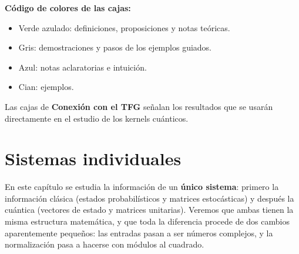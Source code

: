 \documentclass[11pt, a4paper, twoside, openright]{report}
\begin{document}
\noindent \textbf{Código de colores de las cajas:}
\begin{itemize}
    \item \colorbox{teal!10}{Verde azulado}: definiciones, proposiciones y notas teóricas.
    \item \colorbox{gray!10}{Gris}: demostraciones y pasos de los ejemplos guiados.
    \item \colorbox{blue!8}{Azul}: notas aclaratorias e intuición.
    \item \colorbox{cyan!10}{Cian}: ejemplos.
\end{itemize}

\noindent Las cajas de \textbf{Conexión con el TFG} señalan los resultados que se usarán directamente en el estudio de los kernels cuánticos.

\cleardoublepage
\tableofcontents


\chapter{Sistemas individuales}

\noindent En este capítulo se estudia la información de un \textbf{único sistema}: primero la información clásica (estados probabilísticos y matrices estocásticas) y después la cuántica (vectores de estado y matrices unitarias). Veremos que ambas tienen la misma estructura matemática, y que toda la diferencia procede de dos cambios aparentemente pequeños: las entradas pasan a ser números complejos, y la normalización pasa a hacerse con módulos al cuadrado.
\end{document}
